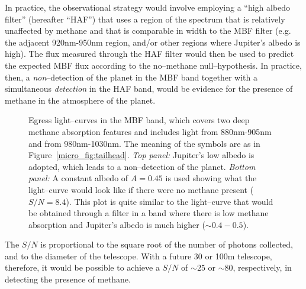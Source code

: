 In practice, the observational strategy would involve employing a
``high albedo filter'' (hereafter ``HAF'') that uses a region of the
spectrum that is relatively unaffected by methane and that is
comparable in width to the MBF filter (e.g. the adjacent 920nm-950nm
region, and/or other regions where Jupiter's albedo is high).  The
flux measured through the HAF filter would then be used to predict the
expected MBF flux according to the no--methane null--hypothesis.  In
practice, then, a \emph{non}--detection of the planet in the MBF band
together with a simultaneous \emph{detection} in the HAF band, would
be evidence for the presence of methane in the atmosphere of the
planet.
%
\begin{figure}[p]
\caption[Egress light-curves in MBF band.]{Egress light--curves in the
MBF band, which covers two deep methane absorption features and
includes light from 880nm-905nm and from 980nm-1030nm.  The meaning of
the symbols are as in Figure~\ref{micro_fig:tailhead}.  {\em Top
panel:} Jupiter's low albedo is adopted, which leads to a
non--detection of the planet.  {\em Bottom panel:} A constant albedo
of $A=0.45$ is used showing what the light--curve would look like if
there were no methane present ($S/N = 8.4$).  This plot is quite
similar to the light--curve that would be obtained through a filter in
a band where there is low methane absorption and Jupiter's albedo is
much higher ($\sim0.4-0.5$).}
\label{micro_fig:methalb} 
\end{figure}
\afterpage{\clearpage}
%
The $S/N$ is proportional to the square root of the number of photons
collected, and to the diameter of the telescope.  With a future 30 or
100m telescope, therefore, it would be possible to achieve a $S/N$ of
$\sim 25$ or $\sim 80$, respectively, in detecting the presence of
methane.



